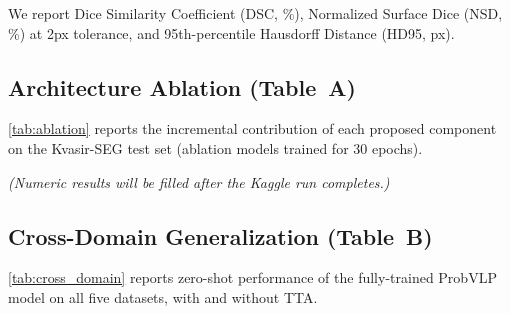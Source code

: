 We report Dice Similarity Coefficient (DSC, \%), Normalized Surface Dice
(NSD, \%) at 2px tolerance, and 95th-percentile Hausdorff Distance (HD95, px).

\subsection{Architecture Ablation (Table~A)}
\label{subsec:ablation}

\cref{tab:ablation} reports the incremental contribution of each proposed
component on the Kvasir-SEG test set (ablation models trained for 30 epochs).

\begin{table}[h]
\centering
\caption{Architecture ablation on Kvasir-SEG (in-domain).}
\label{tab:ablation}
\end{table}

\noindent\textit{(Numeric results will be filled after the Kaggle run completes.)}

\subsection{Cross-Domain Generalization (Table~B)}
\label{subsec:cross_domain}

\cref{tab:cross_domain} reports zero-shot performance of the fully-trained ProbVLP
model on all five datasets, with and without TTA.

